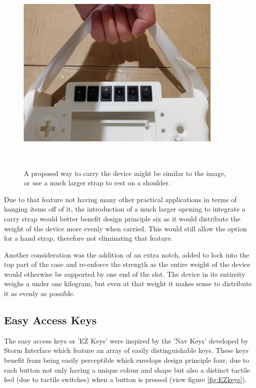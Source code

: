 \begin{figure} [h]
    \centering
    \includegraphics[width=10cm,height=10cm,keepaspectratio]{Figures/carry_strap.png}
    \caption{A proposed way to carry the device might be similar to the image, or use a much larger strap to rest on a shoulder.}
    \label{fig:Carry}
\end{figure}

Due to that feature not having many other practical applications in terms of hanging items off of it, the introduction of a much larger opening to integrate a carry strap would better benefit design principle six as it would distribute the weight of the device more evenly when carried.
This would still allow the option for a hand strap, therefore not eliminating that feature.
 
Another consideration was the addition of an extra notch, added to lock into the top part of the case and re-enforce the strength as the entire weight of the device would otherwise be supported by one end of the slot. %
The device in its entireity weighs a under one kilogram, but even at that weight it makes sense to distribute it as evenly as possible.

\subsection{Easy Access Keys} \label{EZkeys}

The easy access keys or 'EZ Keys' were inspired by the 'Nav Keys' developed by Storm Interface \cite{navpad} which feature an array of easily distinguishable keys.
These keys benefit from being easily perceptible which envelops design principle four, due to each button not only having a unique colour and shape but also a distinct tactile feel (due to tactile switches) when a button is pressed (view figure \ref{fig:EZkeys}).

